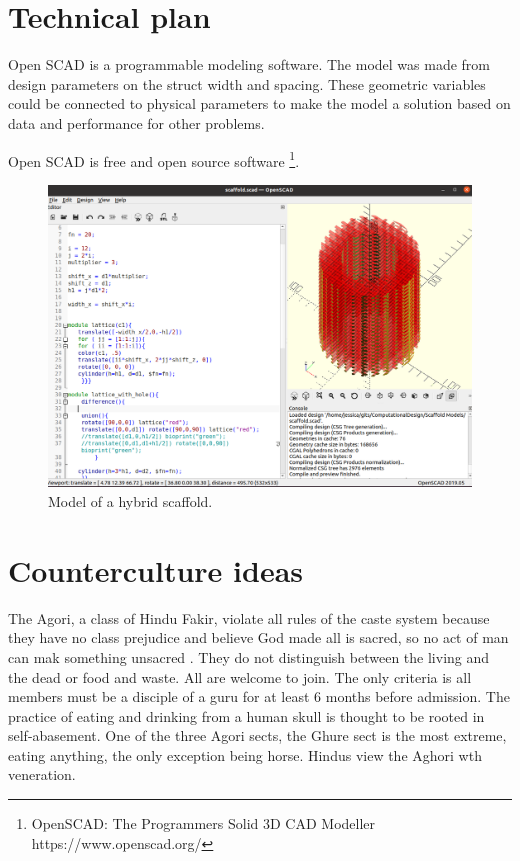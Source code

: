 \documentclass[a4paper,11pt]{article}
\begin{document}
\section{Technical plan}

Open SCAD is a programmable modeling software. The model was made from design parameters on the struct width and spacing. These geometric variables could be connected to physical parameters to make the model a solution based on data and performance for other problems. 

Open SCAD is free and open source software \footnote{
OpenSCAD: The Programmers Solid 3D CAD Modeller https://www.openscad.org/}.

\begin{figure}
  \includegraphics[width=\linewidth]{day05.png}
  \caption{Model of a hybrid scaffold.}
  \label{fig:boat1}
\end{figure}

\section{Counterculture ideas}

The Agori, a class of Hindu Fakir, violate all rules of the caste system because they have no class prejudice and believe God made all is sacred, so no act of man can mak something unsacred \cite{balfour1897life}. They do not distinguish between the living and the dead or food and waste. All are welcome to join. The only criteria is all members must be a disciple of a guru for at least 6 months before admission. The practice of eating and drinking from a human skull is thought to be rooted in self-abasement. One of the three Agori sects, the Ghure sect is the most extreme, eating anything, the only exception being horse. Hindus view the Aghori wth veneration. 





\newpage
\end{document}

